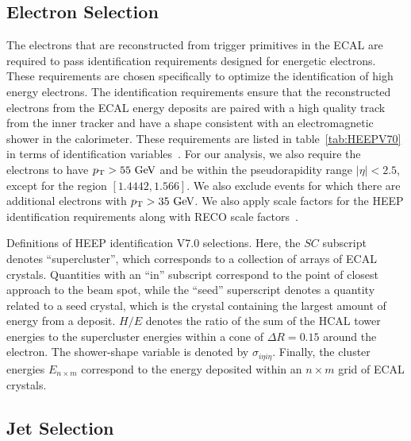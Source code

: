 \subsection{Electron Selection}
\label{subsec:elecSelect}

The electrons that are reconstructed from trigger primitives in the ECAL are required to pass identification requirements designed for energetic electrons.
These requirements are chosen specifically to optimize the identification of high energy electrons.
The identification requirements ensure that the reconstructed electrons from the ECAL energy deposits are paired with a high quality track from the inner tracker and have a shape consistent with an electromagnetic shower in the calorimeter.
These requirements are listed in table~\ref{tab:HEEPV70} in terms of identification variables~\cite{CMSe}.
For our analysis, we also require the electrons to have $\pt>55\unit{GeV}$ and be within the pseudorapidity range $|\eta|<2.5$, except for the region $[1.4442,1.566]$.
We also exclude events for which there are additional electrons with $\pt>35\unit{GeV}$.
We also apply scale factors for the HEEP identification requirements along with RECO scale factors~\cite{EgammaScale}.

\begin{table}[htbp]
  \centering
  
  \caption{
    Definitions of HEEP identification V7.0 selections.
    Here, the $SC$ subscript denotes ``supercluster'', which corresponds to a collection of arrays of ECAL crystals.
    Quantities with an ``in'' subscript correspond to the point of closest approach to the beam spot, while the ``seed'' superscript denotes a quantity related to a seed crystal, which is the crystal containing the largest amount of energy from a deposit.
    $H/E$ denotes the ratio of the sum of the HCAL tower energies to the supercluster energies within a cone of $\Delta R=0.15$ around the electron.
    The shower-shape variable is denoted by $\sigma_{i\eta i\eta}$.
    Finally, the cluster energies $E_{n\times m}$ correspond to the energy deposited within an $n\times m$ grid of ECAL crystals.
  }
  \label{tab:HEEPV70}
\end{table}

\subsection{Jet Selection}
\label{subsec:jetSelect}

